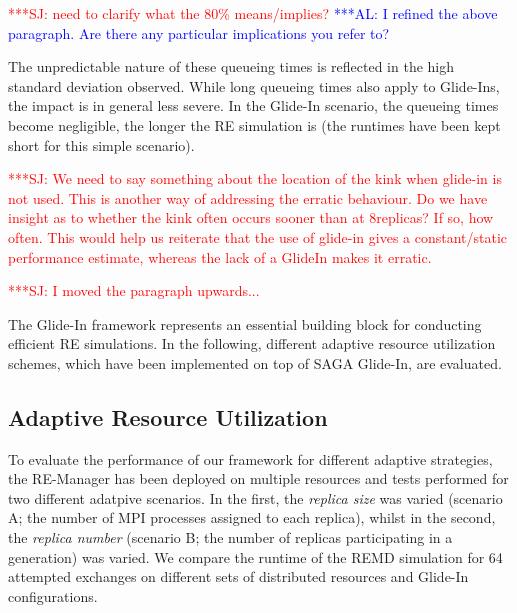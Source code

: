 \documentclass{rspublic}
\newcommand{\alnote}[1]{ {\textcolor{blue} { ***AL: #1 }}}
\newcommand{\jhanote}[1]{ {\textcolor{red} { ***SJ: #1 }}}
\newcommand{\alnote}[1]{}
\newcommand{\jhanote}[1]{}
\begin{document}
\jhanote{need to clarify what the 80\% means/implies?} \alnote{I
  refined the above paragraph. Are there any particular implications
  you refer to?}

The unpredictable nature of these queueing times is reflected in the
high standard deviation observed. While long queueing times also apply
to Glide-Ins, the impact is in general less severe.  In the Glide-In
scenario, the queueing times become negligible, the longer the RE
simulation is (the runtimes have been kept short for this simple
scenario).

\jhanote{We need to say something about the location of the kink when
  glide-in is not used. This is another way of addressing the erratic
  behaviour. Do we have insight as to whether the kink often occurs
  sooner than at 8replicas? If so, how often.  This would help us
  reiterate that the use of glide-in gives a constant/static
  performance estimate, whereas the lack of a GlideIn makes it
  erratic.}

\jhanote{I moved the paragraph upwards...}

The Glide-In framework represents an essential building block for
conducting efficient RE simulations. In the following,
different adaptive resource utilization schemes, which have been
implemented on top of SAGA Glide-In, are evaluated.

\subsection{Adaptive Resource Utilization}

To evaluate the performance of our framework for different adaptive
strategies, the RE-Manager has been deployed on multiple
resources %
and tests performed for two different adatpive scenarios.  In the
first, the \emph{replica size} was varied (scenario A; the number of
MPI processes assigned to each replica), whilst in the second, the
\emph{replica number} (scenario B; the number of replicas
participating in a generation) was varied. We compare the runtime of
the REMD simulation for 64 attempted exchanges on different sets of
distributed resources and Glide-In configurations.
                    
\end{document}
